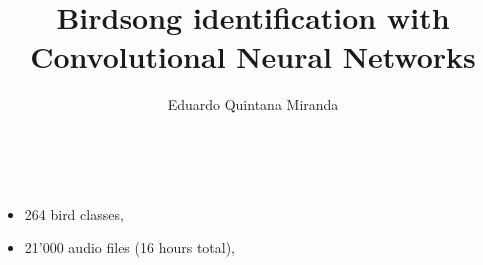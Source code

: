 \documentclass{beamer}
\title{Birdsong identification with Convolutional Neural Networks}
\author{Eduardo Quintana Miranda}
\begin{document}
\frame{\titlepage}

\begin{frame}
    \begin{figure}\
    \end{figure}
    \begin{itemize}
        \item 264 bird classes,
        \item 21'000 audio files (16 hours total),
    \end{itemize}
\end{frame}
\end{document}
